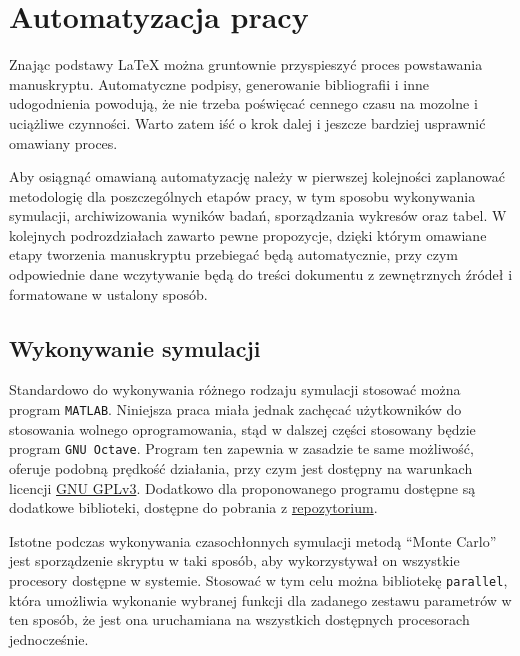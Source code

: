 \chapter{Automatyzacja pracy}

Znając podstawy \LaTeX{} można gruntownie przyspieszyć proces powstawania manuskryptu. Automatyczne podpisy, generowanie bibliografii i inne udogodnienia powodują, że nie trzeba poświęcać cennego czasu na mozolne i uciążliwe czynności. Warto zatem iść o krok dalej i jeszcze bardziej usprawnić omawiany proces.

Aby osiągnąć omawianą automatyzację należy w pierwszej kolejności zaplanować metodologię dla poszczególnych etapów pracy, w tym sposobu wykonywania symulacji, archiwizowania wyników badań, sporządzania wykresów oraz tabel. W kolejnych podrozdziałach zawarto pewne propozycje, dzięki którym omawiane etapy tworzenia manuskryptu przebiegać będą automatycznie, przy czym odpowiednie dane wczytywanie będą do treści dokumentu z zewnętrznych źródeł i formatowane w ustalony sposób.

\section{Wykonywanie symulacji}

Standardowo do wykonywania różnego rodzaju symulacji stosować można program \texttt{MATLAB}. Niniejsza praca miała jednak zachęcać użytkowników do stosowania wolnego oprogramowania, stąd w dalszej części stosowany będzie program \texttt{GNU Octave}. Program ten zapewnia w zasadzie te same możliwość, oferuje podobną prędkość działania, przy czym jest dostępny na warunkach licencji \href{https://www.gnu.org/licenses/gpl-3.0.html}{GNU GPLv3}. Dodatkowo dla proponowanego programu dostępne są dodatkowe biblioteki, dostępne do pobrania z \href{https://octave.sourceforge.io/packages.php}{repozytorium}.

Istotne podczas wykonywania czasochłonnych symulacji metodą \enquote{Monte Carlo}~\cite{jcgm_montecarlo} jest sporządzenie skryptu w taki sposób, aby wykorzystywał on wszystkie procesory dostępne w systemie. Stosować w tym celu można bibliotekę \texttt{parallel}, która umożliwia wykonanie wybranej funkcji dla zadanego zestawu parametrów w ten sposób, że jest ona uruchamiana na wszystkich dostępnych procesorach jednocześnie.

